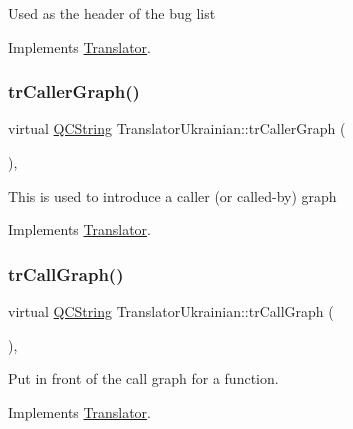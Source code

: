 Used as the header of the bug list 

Implements \mbox{\hyperlink{class_translator}{Translator}}.

\mbox{\label{class_translator_ukrainian_a0a3e38a59461b3681f256178125fc943}} 
\subsubsection{\texorpdfstring{trCallerGraph()}{trCallerGraph()}}
{\footnotesize\ttfamily virtual \mbox{\hyperlink{class_q_c_string}{Q\+C\+String}} Translator\+Ukrainian\+::tr\+Caller\+Graph (\begin{DoxyParamCaption}{ }\end{DoxyParamCaption})\hspace{0.3cm}{\ttfamily [inline]}, {\ttfamily [virtual]}}

This is used to introduce a caller (or called-\/by) graph 

Implements \mbox{\hyperlink{class_translator}{Translator}}.

\mbox{\label{class_translator_ukrainian_abac81de6bb772c8a5cb459fb16c67894}} 
\subsubsection{\texorpdfstring{trCallGraph()}{trCallGraph()}}
{\footnotesize\ttfamily virtual \mbox{\hyperlink{class_q_c_string}{Q\+C\+String}} Translator\+Ukrainian\+::tr\+Call\+Graph (\begin{DoxyParamCaption}{ }\end{DoxyParamCaption})\hspace{0.3cm}{\ttfamily [inline]}, {\ttfamily [virtual]}}

Put in front of the call graph for a function. 

Implements \mbox{\hyperlink{class_translator}{Translator}}.

\mbox{\label{class_translator_ukrainian_ac8c875c1b927d0a69d1a23e6b5b037c1}} 

